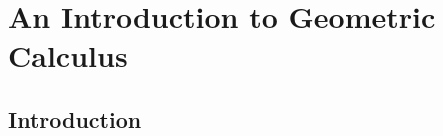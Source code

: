 \newcommand{\genf}{ {\textsf {f}} }
\newcommand{\dbar}{\underline{\d}}
\newcommand{\Fbar}{\underline{F}}
\newcommand{\fbar}{\underline{f}}
\newcommand{\fadj}{\adjoint{f}}
\newcommand{\Fadj}{\adjoint{F}}
\newcommand{\radj}{{\adjoint r}}
\newcommand{\psidot}{\dot{\psi}}
\renewcommand{\star}{\ast}
\renewcommand{\C}{{\cal C}}
\renewcommand{\L}{{\cal L}}

\chapter{An Introduction to Geometric Calculus}\label{ch:gc}

\section{Introduction}


